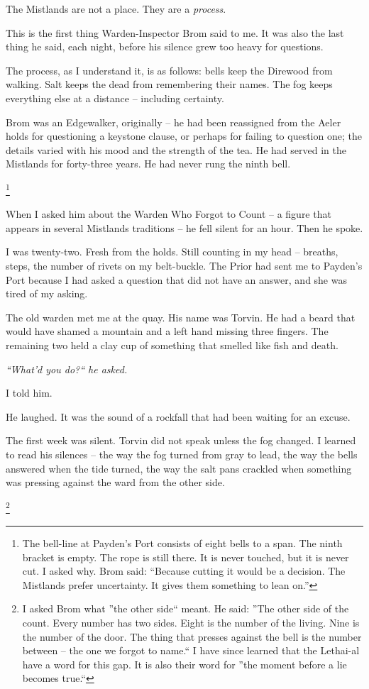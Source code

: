 \documentclass[12pt]{article}
\begin{document}
The Mistlands are not a place. They are a \textit{process}.

This is the first thing Warden-Inspector Brom said to me. It was also the last thing he said, each night, before his silence grew too heavy for questions.

The process, as I understand it, is as follows: bells keep the Direwood from walking. Salt keeps the dead from remembering their names. The fog keeps everything else at a distance -- including certainty.

Brom was an Edgewalker, originally -- he had been reassigned from the Aeler holds for questioning a keystone clause, or perhaps for failing to question one; the details varied with his mood and the strength of the tea. He had served in the Mistlands for forty-three years. He had never rung the ninth bell.

\footnote{The bell-line at Payden's Port consists of eight bells to a span. The ninth bracket is empty. The rope is still there. It is never touched, but it is never cut. I asked why. Brom said: ``Because cutting it would be a decision. The Mistlands prefer uncertainty. It gives them something to lean on.''}

When I asked him about the Warden Who Forgot to Count -- a figure that appears in several Mistlands traditions -- he fell silent for an hour. Then he spoke.

I was twenty-two. Fresh from the holds. Still counting in my head -- breaths, steps, the number of rivets on my belt-buckle. The Prior had sent me to Payden's Port because I had asked a question that did not have an answer, and she was tired of my asking.

The old warden met me at the quay. His name was Torvin. He had a beard that would have shamed a mountain and a left hand missing three fingers. The remaining two held a clay cup of something that smelled like fish and death.

\textit{``What'd you do?`` he asked.}

I told him.

He laughed. It was the sound of a rockfall that had been waiting for an excuse.

The first week was silent. Torvin did not speak unless the fog changed. I learned to read his silences -- the way the fog turned from gray to lead, the way the bells answered when the tide turned, the way the salt pans crackled when something was pressing against the ward from the other side.

\footnote{I asked Brom what ''the other side`` meant. He said: ''The other side of the count. Every number has two sides. Eight is the number of the living. Nine is the number of the door. The thing that presses against the bell is the number between -- the one we forgot to name.`` I have since learned that the Lethai-al have a word for this gap. It is also their word for ''the moment before a lie becomes true.``}
\end{document}
